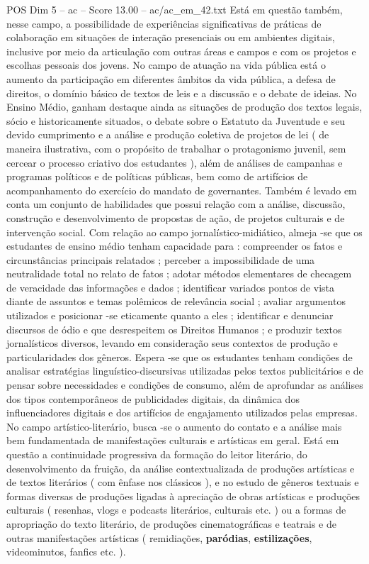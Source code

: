 \begin{textsample}{POS Dim 5 – ac – Score 13.00 – ac/ac\_em\_42.txt}
Está em questão também, nesse campo, a possibilidade de experiências significativas de práticas de colaboração em situações de interação presenciais ou em ambientes digitais, inclusive por meio da articulação com outras áreas e campos e com os projetos e escolhas pessoais dos jovens.
No campo de atuação na vida pública está o aumento da participação em diferentes âmbitos da vida pública, a defesa de direitos, o domínio básico de textos de leis e a discussão e o debate de ideias.
No Ensino Médio, ganham destaque ainda as situações de produção dos textos legais, sócio e historicamente situados, o debate sobre o Estatuto da Juventude e seu devido cumprimento e a análise e produção coletiva de projetos de lei ( de maneira ilustrativa, com o propósito de trabalhar o protagonismo juvenil, sem cercear o processo criativo dos estudantes ), além de análises de campanhas e programas políticos e de políticas públicas, bem como de artifícios de acompanhamento do exercício do mandato de governantes.
Também é levado em conta um conjunto de habilidades que possui relação com a análise, discussão, construção e desenvolvimento de propostas de ação, de projetos culturais e de intervenção social.
Com relação ao campo jornalístico-midiático, almeja -se que os estudantes de ensino médio tenham capacidade para : compreender os fatos e circunstâncias principais relatados ; perceber a impossibilidade de uma neutralidade total no relato de fatos ; adotar métodos elementares de checagem de veracidade das informações e dados ; identificar variados pontos de vista diante de assuntos e temas polêmicos de relevância social ; avaliar argumentos utilizados e posicionar -se eticamente quanto a eles ; identificar e denunciar discursos de ódio e que desrespeitem os Direitos Humanos ; e produzir textos jornalísticos diversos, levando em consideração seus contextos de produção e particularidades dos gêneros.
Espera -se que os estudantes tenham condições de analisar estratégias linguístico-discursivas utilizadas pelos textos publicitários e de pensar sobre necessidades e condições de consumo, além de aprofundar as análises dos tipos contemporâneos de publicidades digitais, da dinâmica dos influenciadores digitais e dos artifícios de engajamento utilizados pelas empresas.
No campo artístico-literário, busca -se o aumento do contato e a análise mais bem fundamentada de manifestações culturais e artísticas em geral.
Está em questão a continuidade progressiva da formação do leitor literário, do desenvolvimento da fruição, da análise contextualizada de produções artísticas e de textos literários ( com ênfase nos clássicos ), e no estudo de gêneros textuais e formas diversas de produções ligadas à apreciação de obras artísticas e produções culturais ( resenhas, vlogs e podcasts literários, culturais etc. ) ou a formas de apropriação do texto literário, de produções cinematográficas e teatrais e de outras manifestações artísticas ( remidiações, \textbf{paródias}, \textbf{estilizações}, videominutos, fanfics etc. ).

\end{textsample}
